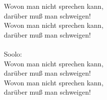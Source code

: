
            Wovon man nicht sprechen kann, \\
            darüber muß man schweigen! \\
            Wovon man nicht sprechen kann, \\
            darüber muß man schweigen! \\
\hspace{10mm} \\
            Soolo: \\
            Wovon man nicht sprechen kann, \\
            darüber muß man schweigen! \\
            Wovon man nicht sprechen kann, \\
            darüber muß man schweigen! \\

